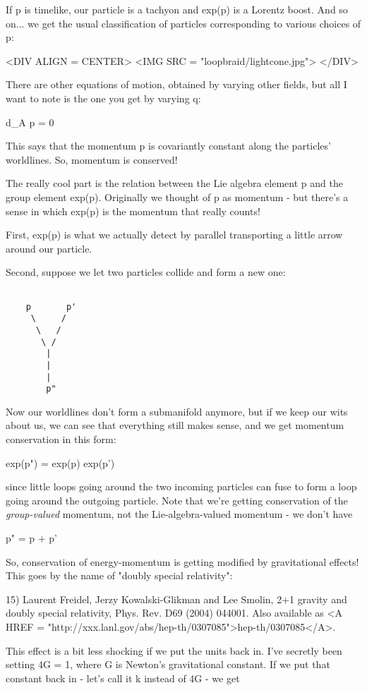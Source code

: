 If p is timelike, our particle is a tachyon and exp(p) is a Lorentz
boost.  And so on... we get the usual classification of particles
corresponding to various choices of p:

<DIV ALIGN = CENTER>
<IMG SRC = "loopbraid/lightcone.jpg">
</DIV>


There are other equations of motion, obtained by varying other fields,
but all I want to note is the one you get by varying q:

d_{A} p = 0

This says that the momentum p is covariantly constant along the
particles' worldlines.  So, momentum is conserved!

The really cool part is the relation between the Lie algebra element p 
and the group element exp(p).  Originally we thought of p as momentum - 
but there's a sense in which exp(p) is the momentum that really counts!  

First, exp(p) is what we actually detect by parallel transporting a 
little arrow around our particle.  

Second, suppose we let two particles collide and form a new one:


\begin{verbatim}

    p       p'
     \     /
      \   /  
       \ /  
        |   
        |   
        |    
        p"
\end{verbatim}
    

Now our worldlines don't form a submanifold anymore, but if we keep 
our wits about us, we can see that everything still makes sense, and
we get momentum conservation in this form:

exp(p") = exp(p) exp(p')

since little loops going around the two incoming particles can fuse to 
form a loop going around the outgoing particle.  Note that we're getting
conservation of the \emph{group-valued} momentum, not the Lie-algebra-valued
momentum - we don't have

p" = p + p'

So, conservation of energy-momentum is getting modified by gravitational
effects!  This goes by the name of "doubly special relativity":

15) Laurent Freidel, Jerzy Kowalski-Glikman and Lee Smolin, 
2+1 gravity and doubly special relativity, Phys. Rev. D69 (2004) 
044001.  Also available as <A HREF = "http://xxx.lanl.gov/abs/hep-th/0307085">hep-th/0307085</A>.

This effect is a bit less shocking if we put the units back in.  I've
secretly been setting 4\pi G = 1, where G is Newton's gravitational 
constant.  If we put that constant back in - let's call it k instead 
of 4\pi G - we get

